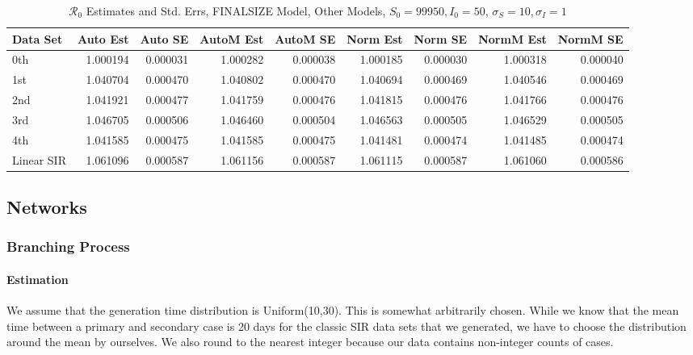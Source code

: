 \documentclass[12pt]{article}
\newcommand{\rr}{\ensuremath{\mathcal{R}_0}}
\begin{document}
\begin{table}[H]
	
	\caption{$\rr$ Estimates and Std. Errs, FINALSIZE Model,
		Other Models, $S_0 = 99950, I_0 = 50$, 
		$\sigma_S = 10, \sigma_I = 1$}
	\begin{footnotesize}
		\hskip -1cm
	\begin{tabular}{l|r|r|r|r|r|r|r|r}
		\hline
		Data Set & Auto Est & Auto SE & AutoM Est & AutoM SE & Norm Est & Norm SE & NormM Est & NormM SE\\
		\hline
		0th & 1.000194 & 0.000031 & 1.000282 & 0.000038 & 1.000185 & 0.000030 & 1.000318 & 0.000040\\
		\hline
		1st & 1.040704 & 0.000470 & 1.040802 & 0.000470 & 1.040694 & 0.000469 & 1.040546 & 0.000469\\
		\hline
		2nd & 1.041921 & 0.000477 & 1.041759 & 0.000476 & 1.041815 & 0.000476 & 1.041766 & 0.000476\\
		\hline
		3rd & 1.046705 & 0.000506 & 1.046460 & 0.000504 & 1.046563 & 0.000505 & 1.046529 & 0.000505\\
		\hline
		4th & 1.041585 & 0.000475 & 1.041585 & 0.000475 & 1.041481 & 0.000474 & 1.041485 & 0.000474\\
		\hline
		Linear SIR & 1.061096 & 0.000587 & 1.061156 & 0.000587 & 1.061115 & 0.000587 & 1.061060 & 0.000586\\
		\hline
	\end{tabular}
\end{footnotesize}
\end{table}

\subsection{Networks}

\subsubsection{Branching Process}

\paragraph{Estimation}

We assume that the generation time distribution is Uniform(10,30). This is somewhat arbitrarily chosen. While we know that the mean time between a primary and secondary case is 20 days for the classic SIR data sets that we generated, we have to choose the distribution around the mean by ourselves. We also round to the nearest integer because our data contains non-integer counts of cases.
\end{document}
